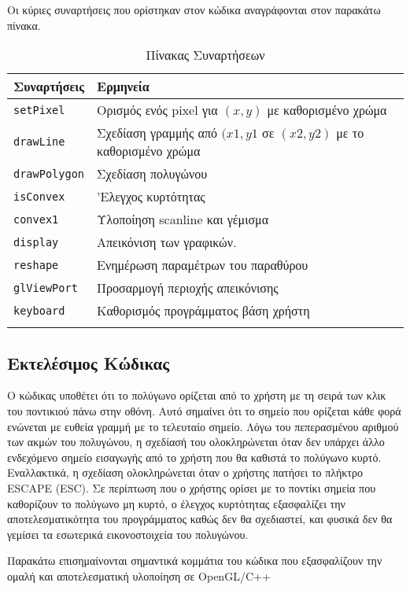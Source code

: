 \vspace{3em}
Οι κύριες συναρτήσεις που ορίστηκαν στον κώδικα αναγράφονται στον παρακάτω πίνακα. 
\vspace{3em}
\begin{center}
    \begin{longtable}{p{5cm}|p{6cm}} 
        \textbf{Συναρτήσεις} & \textbf{Ερμηνεία} \\ \hline \hline
        \textlatin{\lstinline[language=C++]!setPixel!} & Ορισμός ενός \textlatin{pixel} για $(x,y)$ με καθορισμένο χρώμα \\ \hline
        \textlatin{\lstinline[language=C++]!drawLine!} & Σχεδίαση γραμμής από $(x1,y1$ σε $(x2,y2)$ με το καθορισμένο χρώμα \\ \hline
        \textlatin{\lstinline[language=C++]!drawPolygon!} & Σχεδίαση πολυγώνου \\ \hline
        \textlatin{\lstinline[language=C++]!isConvex!} & 'Ελεγχος κυρτότητας \\ \hline
        \textlatin{\lstinline[language=C++]!convex1!}  & Υλοποίηση \textlatin{scanline} και γέμισμα \\ \hline
        \textlatin{\lstinline[language=C++]!display!} & Απεικόνιση των γραφικών. \\ \hline
        \textlatin{\lstinline[language=C++]!reshape!} & Ενημέρωση παραμέτρων του παραθύρου \\
        \hline
        \textlatin{\lstinline[language=C++]!glViewPort!} & Προσαρμογή περιοχής απεικόνισης \\ \hline
        \textlatin{\lstinline[language=C++]!keyboard!} & Καθορισμός προγράμματος βάση χρήστη \\
    \caption{Πίνακας Συναρτήσεων}
    \end{longtable}
\end{center}

\subsection{Εκτελέσιμος Κώδικας}

Ο κώδικας υποθέτει ότι το πολύγωνο ορίζεται από το χρήστη με τη σειρά των κλικ του ποντικιού πάνω στην οθόνη. Αυτό σημαίνει ότι το σημείο που ορίζεται κάθε φορά ενώνεται με ευθεία γραμμή με το τελευταίο σημείο. Λόγω του πεπερασμένου αριθμού των ακμών του πολυγώνου, η σχεδίασή του ολοκληρώνεται όταν δεν υπάρχει άλλο ενδεχόμενο σημείο εισαγωγής από το χρήστη που θα καθιστά το πολύγωνο κυρτό. Εναλλακτικά, η σχεδίαση ολοκληρώνεται όταν ο χρήστης πατήσει το πλήκτρο \textlatin{ESCAPE (ESC)}. Σε περίπτωση που ο χρήστης ορίσει με το ποντίκι σημεία που καθορίζουν το πολύγωνο μη κυρτό, ο έλεγχος κυρτότητας εξασφαλίζει την αποτελεσματικότητα του προγράμματος καθώς δεν θα σχεδιαστεί, και φυσικά δεν θα γεμίσει τα εσωτερικά εικονοστοιχεία του πολυγώνου. 
 \par
 Παρακάτω επισημαίνονται σημαντικά κομμάτια του κώδικα που εξασφαλίζουν την ομαλή και αποτελεσματική υλοποίηση σε \textlatin{OpenGL/C++}
 
